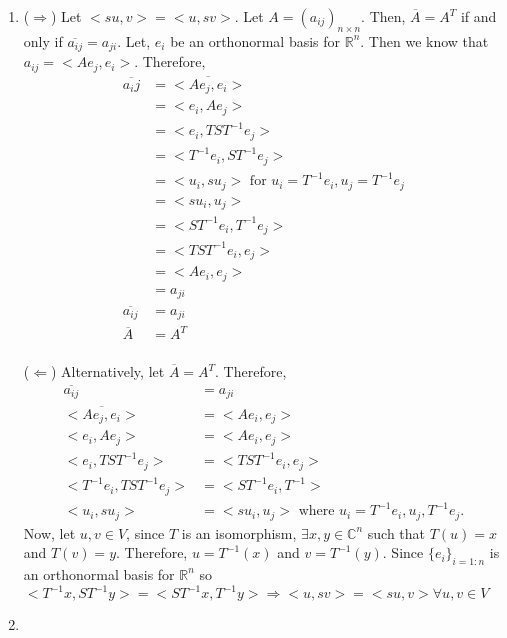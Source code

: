 \documentclass{article}
\begin{document}
\begin{enumerate}
    \item
    
    ($\Rightarrow$) Let $<su, v>=<u, sv>$. Let $A=(a_{ij})_{n\times n}$. Then, $\overline{A}=A^T$ if and only if $\overline{a_{ij}}=a_{ji}$. Let, $e_i$ be an orthonormal basis for $\mathbb{R}^n$. Then we know that $a_{ij}=<Ae_j, e_i>$. Therefore,
    \begin{align*}
        \overline{a_ij} &= \overline{<Ae_j, e_i>}\\
        &= <e_i, Ae_j>\\
        &= <e_i, TST^{-1}e_j>\\
        &= <T^{-1}e_i, ST^{-1}e_j>\\
        &= <u_i, su_j> \text{ for } u_i = T^{-1}e_i, u_j=T^{-1}e_j\\
        &= <su_i, u_j>\\
        &= <ST^{-1}e_i, T^{-1}e_j>\\
        &= <TST^{-1}e_i, e_j>\\
        &= <Ae_i, e_j>\\
        &= a_{ji}\\
        \overline{a_{ij}}&=a_{ji}\\
        \overline{A}&=A^T
    \end{align*}\\
    ($\Leftarrow$) Alternatively, let $\overline{A}=A^T$. Therefore, \begin{align*}
        \overline{a_{ij}}&=a_{ji}\\
        \overline{<Ae_j, e_i>} &= <Ae_i, e_j>\\
        <e_i, Ae_j> &= <Ae_i, e_j>\\
        <e_i, TST^{-1}e_j> &= <TST^{-1}e_i, e_j>\\
        <T^{-1}e_i, TST^{-1}e_j> &= <ST^{-1}e_i, T^{-1}>\\
        <u_i, su_j> &= <su_i, u_j> \text{ where } u_i=T^{-1}e_i, u_j, T^{-1}e_j.
    \end{align*} Now, let $u, v\in V$, since $T$ is an isomorphism, $\exists x, y\in\mathbb{C}^n$ such that $T(u)=x$ and $T(v)=y$. Therefore, $u=T^{-1}(x)$ and $v=T^{-1}(y)$. Since $\{e_i\}_{i=1:n}$ is an orthonormal basis for $\mathbb{R}^n$ so $<T^{-1}x, ST^{-1}y>=<ST^{-1}x, T^{-1}y> \Rightarrow <u, sv>=<su, v> \forall u, v\in V$
    
    \item
    

\end{enumerate}
\end{document}
